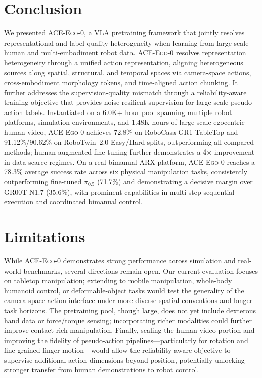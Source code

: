 \documentclass{llmxive}
\providecommand{\OURS}{\textsc{ACE-Ego-0}\xspace}
\providecommand{\Ours}{\OURS}
\begin{document}

\section{Conclusion}
\label{sec:conclusion}
We presented \Ours, a VLA pretraining framework that jointly resolves representational and label-quality heterogeneity when learning from large-scale human and multi-embodiment robot data.
\Ours resolves representation heterogeneity through a unified action representation, aligning heterogeneous sources along spatial, structural, and temporal spaces via camera-space actions, cross-embodiment morphology tokens, and time-aligned action chunking. It further addresses the supervision-quality mismatch through a reliability-aware training objective that provides noise-resilient supervision for large-scale pseudo-action labels.
Instantiated on a 6.0K+ hour pool spanning multiple robot platforms, simulation environments, and 1.48K hours of large-scale egocentric human video, \Ours achieves 72.8\% on RoboCasa GR1 TableTop and 91.12\%/90.62\% on RoboTwin~2.0 Easy/Hard splits, outperforming all compared methods; human-augmented fine-tuning further demonstrates a 4$\times$ improvement in data-scarce regimes.
On a real bimanual ARX platform, \Ours reaches a 78.3\% average success rate across six physical manipulation tasks, consistently outperforming fine-tuned $\pi_{0.5}$ (71.7\%) and demonstrating a decisive margin over GR00T-N1.7 (35.6\%), with prominent capabilities in multi-step sequential execution and coordinated bimanual control.

\section{Limitations} 
While \Ours demonstrates strong performance across simulation and real-world benchmarks, several directions remain open. Our current evaluation focuses on tabletop manipulation; extending to mobile manipulation, whole-body humanoid control, or deformable-object tasks would test the generality of the camera-space action interface under more diverse spatial conventions and longer task horizons. The pretraining pool, though large, does not yet include dexterous hand data or force/torque sensing; incorporating richer modalities could further improve contact-rich manipulation. Finally, scaling the human-video portion and improving the fidelity of pseudo-action pipelines---particularly for rotation and fine-grained finger motion---would allow the reliability-aware objective to supervise additional action dimensions beyond position, potentially unlocking stronger transfer from human demonstrations to robot control.
\end{document}
